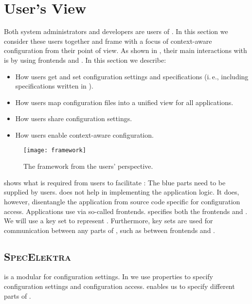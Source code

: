 \section{User's View}
\label{sec:users-view}

Both system administrators and developers are users of \elektra{}.
In this section we consider these users together and frame \elektra{} with a focus of context-aware configuration from their point of view.
As shown in , their main interactions with \elektra{} is by using frontends and .
In this section we describe:
\begin{itemize}
\item How users get and set configuration settings and specifications (i.\,e., including specifications written in ).
\item How users map configuration files into a unified view for all applications.
\item How users share configuration settings.
\item How users enable context-aware configuration.
\end{itemize}

\begin{figure}[htp]
\centering
\texttt{[image: framework]}
\caption{The \elektra{} framework from the users' perspective.}
\label{fig:framework}
\end{figure}

 shows what is required from users to facilitate \elektra{}:
The blue parts need to be supplied by users.
\elektra{} does not help in implementing the application logic.
It does, however, disentangle the application from source code specific for configuration access.
Applications use  via so-called frontends.
 specifies both the frontends and .
We will use a key set to represent .
Furthermore, key sets are used for communication between any parts of \elektra{}, such as between frontends and .

\subsection{\textsc{SpecElektra}}
\label{sec:spec}

 is a modular  for configuration settings.
In  we use properties to specify configuration settings and configuration access.
 enables us to specify different parts of \elektra{}.

